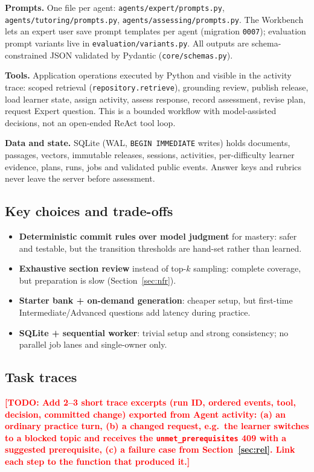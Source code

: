 \documentclass{article}
\newcommand{\todo}[1]{\textcolor{red}{\textbf{[TODO: #1]}}}
\newcommand{\code}[1]{\texttt{\small #1}}
\begin{document}
\textbf{Prompts.} One file per agent: \code{agents/expert/prompts.py}, \code{agents/tutoring/prompts.py}, \code{agents/assessing/prompts.py}. The Workbench lets an expert user save prompt templates per agent (migration \code{0007}); evaluation prompt variants live in \code{evaluation/variants.py}. All outputs are schema-constrained JSON validated by Pydantic (\code{core/schemas.py}).

\textbf{Tools.} Application operations executed by Python and visible in the activity trace: scoped retrieval (\code{repository.retrieve}), grounding review, publish release, load learner state, assign activity, assess response, record assessment, revise plan, request Expert question. This is a bounded workflow with model-assisted decisions, not an open-ended ReAct tool loop.

\textbf{Data and state.} SQLite (WAL, \code{BEGIN IMMEDIATE} writes) holds documents, passages, vectors, immutable releases, sessions, activities, per-difficulty learner evidence, plans, runs, jobs and validated public events. Answer keys and rubrics never leave the server before assessment.

\subsection{Key choices and trade-offs}
\begin{itemize}
\item \textbf{Deterministic commit rules over model judgment} for mastery: safer and testable, but the transition thresholds are hand-set rather than learned.
\item \textbf{Exhaustive section review} instead of top-$k$ sampling: complete coverage, but preparation is slow (Section~\ref{sec:nfr}).
\item \textbf{Starter bank + on-demand generation}: cheaper setup, but first-time Intermediate/Advanced questions add latency during practice.
\item \textbf{SQLite + sequential worker}: trivial setup and strong consistency; no parallel job lanes and single-owner only.
\end{itemize}

\subsection{Task traces}
\todo{Add 2--3 short trace excerpts (run ID, ordered events, tool, decision, committed change) exported from Agent activity: (a) an ordinary practice turn, (b) a changed request, e.g.\ the learner switches to a blocked topic and receives the \code{unmet\_prerequisites} 409 with a suggested prerequisite, (c) a failure case from Section~\ref{sec:rel}. Link each step to the function that produced it.}
\end{document}
